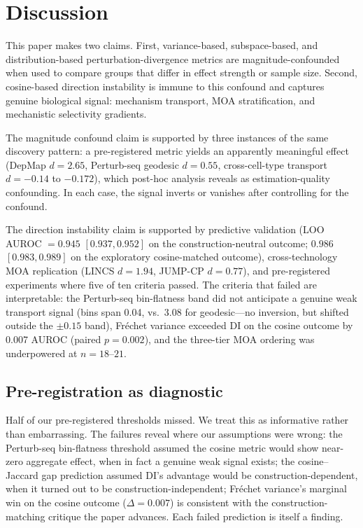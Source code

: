 \documentclass[11pt]{article}
\begin{document}
\section{Discussion}

This paper makes two claims. First, variance-based, subspace-based, and
distribution-based perturbation-divergence metrics are
magnitude-confounded when used to compare groups that differ in effect
strength or sample size. Second, cosine-based direction instability is
immune to this confound and captures genuine biological signal: mechanism
transport, MOA stratification, and mechanistic selectivity gradients.

The magnitude confound claim is supported by three instances of the same
discovery pattern: a pre-registered metric yields an apparently
meaningful effect (DepMap $d = 2.65$, Perturb-seq geodesic $d = 0.55$,
cross-cell-type transport $d = -0.14$ to $-0.172$), which post-hoc
analysis reveals as estimation-quality confounding. In each case, the
signal inverts or vanishes after controlling for the confound.

The direction instability claim is supported by predictive validation
(LOO AUROC $= 0.945$ $[0.937, 0.952]$ on the construction-neutral
outcome; $0.986$ $[0.983, 0.989]$ on the exploratory cosine-matched
outcome), cross-technology MOA replication (LINCS $d = 1.94$, JUMP-CP
$d = 0.77$), and pre-registered experiments where five of ten criteria
passed. The criteria that failed are interpretable: the Perturb-seq
bin-flatness band did not anticipate a genuine weak transport signal
(bins span 0.04, vs.\ 3.08 for geodesic---no inversion, but shifted
outside the $\pm 0.15$ band), Fr\'{e}chet variance exceeded DI on the
cosine outcome by 0.007 AUROC (paired $p = 0.002$), and the three-tier
MOA ordering was underpowered at $n = 18$--$21$.

\subsection{Pre-registration as diagnostic}

Half of our pre-registered thresholds missed. We treat this as
informative rather than embarrassing. The failures reveal where our
assumptions were wrong: the Perturb-seq bin-flatness threshold assumed
the cosine metric would show near-zero aggregate effect, when in fact a
genuine weak signal exists; the cosine--Jaccard gap prediction assumed
DI's advantage would be construction-dependent, when it turned out to
be construction-independent; Fr\'{e}chet variance's marginal win on the
cosine outcome ($\Delta = 0.007$) is consistent with the
construction-matching critique the paper advances. Each failed
prediction is itself a finding.
\end{document}
